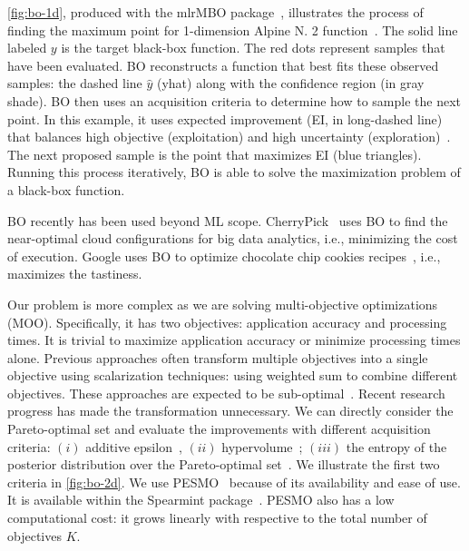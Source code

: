 \autoref{fig:bo-1d}, produced with the mlrMBO package~\cite{bischl2017mlrmbo},
illustrates the process of finding the maximum point for 1-dimension Alpine N. 2
function~\cite{clerc1999swarm}. The solid line labeled $y$ is the target
black-box function. The red dots represent samples that have been evaluated. BO
reconstructs a function that best fits these observed samples: the dashed line
$\hat{y}$ (yhat) along with the confidence region (in gray shade).  BO then uses
an acquisition criteria to determine how to sample the next point.  In this
example, it uses expected improvement (EI, in long-dashed line) that balances
high objective (exploitation) and high uncertainty
(exploration)~\cite{shahriari2016taking}. The next proposed sample is the point
that maximizes EI (blue triangles). Running this process iteratively, BO is able
to solve the maximization problem of a black-box function.


BO recently has been used beyond ML scope.
CherryPick~\cite{alipourfard2017cherrypick} uses BO to find the near-optimal
cloud configurations for big data analytics, i.e., minimizing the cost of
execution. Google uses BO to optimize chocolate chip cookies
recipes~\cite{solnik2017bayesian}, i.e., maximizes the tastiness.

Our problem is more complex as we are solving multi-objective optimizations
(MOO). Specifically, it has two objectives: application accuracy and processing
times. It is trivial to maximize application accuracy or minimize processing
times alone. Previous approaches often transform multiple objectives into a
single objective using scalarization techniques: using weighted sum to combine
different objectives. These approaches are expected to be
sub-optimal~\cite{knowles2006parego}. Recent research progress has made the
transformation unnecessary. We can directly consider the Pareto-optimal set and
evaluate the improvements with different acquisition criteria: $(i)$ additive
epsilon~\cite{binoisgpareto}, $(ii)$ hypervolume~\cite{binoisgpareto}; $(iii)$
the entropy of the posterior distribution over the Pareto-optimal
set~\cite{hernandez2016predictive}. We illustrate the first two criteria in
\autoref{fig:bo-2d}. We use PESMO~\cite{hernandez2016predictive} because of its
availability and ease of use. It is available within the Spearmint
package~\cite{snoek2016spearmint}.  PESMO also has a low computational cost: it
grows linearly with respective to the total number of objectives $K$.

